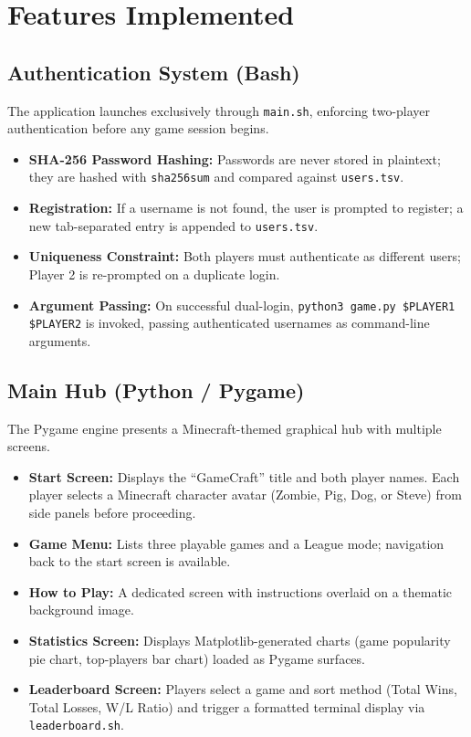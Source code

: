 \documentclass[12pt,a4paper]{article}
\begin{document}
\section{Features Implemented}

\subsection{Authentication System (Bash)}

The application launches exclusively through \texttt{main.sh}, enforcing two-player authentication before any game session begins.

\begin{itemize}
    \item \textbf{SHA-256 Password Hashing:} Passwords are never stored in plaintext; they are hashed with \texttt{sha256sum} and compared against \texttt{users.tsv}.
    \item \textbf{Registration:} If a username is not found, the user is prompted to register; a new tab-separated entry is appended to \texttt{users.tsv}.
    \item \textbf{Uniqueness Constraint:} Both players must authenticate as different users; Player 2 is re-prompted on a duplicate login.
    \item \textbf{Argument Passing:} On successful dual-login, \texttt{python3 game.py \$PLAYER1 \$PLAYER2} is invoked, passing authenticated usernames as command-line arguments.
\end{itemize}

\subsection{Main Hub (Python / Pygame)}

The Pygame engine presents a Minecraft-themed graphical hub with multiple screens.

\begin{itemize}
    \item \textbf{Start Screen:} Displays the ``GameCraft'' title and both player names. Each player selects a Minecraft character avatar (Zombie, Pig, Dog, or Steve) from side panels before proceeding.
    \item \textbf{Game Menu:} Lists three playable games and a League mode; navigation back to the start screen is available.
    \item \textbf{How to Play:} A dedicated screen with instructions overlaid on a thematic background image.
    \item \textbf{Statistics Screen:} Displays Matplotlib-generated charts (game popularity pie chart, top-players bar chart) loaded as Pygame surfaces.
    \item \textbf{Leaderboard Screen:} Players select a game and sort method (Total Wins, Total Losses, W/L Ratio) and trigger a formatted terminal display via \texttt{leaderboard.sh}.
\end{itemize}
\end{document}
